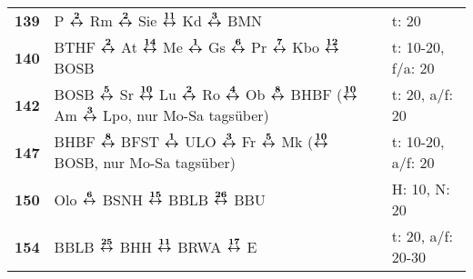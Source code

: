 \begin{minipage}[t]{0.45\textwidth}
\begin{tabular}{>{\bfseries}L{1.2cm}L{9.0cm}L{3.0cm}}
\bus{} 139    & P $\xarwe{2}$ Rm $\xarwe{2}$ Sie $\xarwe{11}$ Kd $\xarwe{3}$ BMN                                                                                                    & t: 20                      \\
\bus{} 140    & BTHF $\xarwe{2}$ At $\xarwe{14}$ Me $\xarwe{1}$ Gs $\xarwe{6}$ Pr $\xarwe{7}$ Kbo $\xarwe{12}$ BOSB                                                                 & t: 10-20, f/a: 20          \\
\bus{} 142    & BOSB $\xarwe{5}$ Sr $\xarwe{10}$ Lu $\xarwe{2}$ Ro $\xarwe{4}$ Ob $\xarwe{8}$ BHBF ($\xarwe{10}$ Am $\xarwe{3}$ Lpo, nur Mo-Sa tagsüber)                            & t: 20, a/f: 20             \\
\bus{} 147    & BHBF $\xarwe{8}$ BFST $\xarwe{1}$ ULO $\xarwe{3}$ Fr $\xarwe{5}$ Mk ($\xarwe{10}$ BOSB, nur Mo-Sa tagsüber)                                                         & t: 10-20, a/f: 20          \\
\bus{} 150    & Olo $\xarwe{6}$ BSNH $\xarwe{15}$ BBLB $\xarwe{26}$ BBU                                                                                                             & H: 10, N: 20               \\
\bus{} 154    & BBLB $\xarwe{25}$ BHH $\xarwe{11}$ BRWA $\xarwe{17}$ E                                                                                                              & t: 20, a/f: 20-30          \\
\hline
\end{tabular}
\end{minipage}
